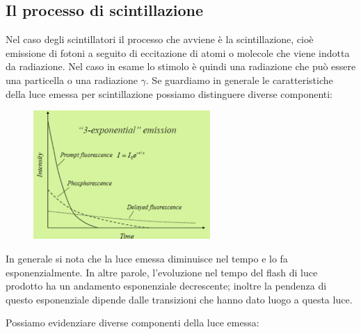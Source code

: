 \subsection{Il processo di scintillazione}
Nel caso degli scintillatori il processo che avviene è la scintillazione, cioè emissione di fotoni a seguito di eccitazione di atomi o molecole che viene indotta da radiazione. Nel caso in esame lo stimolo è quindi una radiazione che può essere una particella o una radiazione $\gamma$. Se guardiamo in generale le caratteristiche della luce emessa per scintillazione possiamo distinguere diverse componenti:
\begin{figure}[H]
   \centering
   \includegraphics[width=0.6\textwidth]{immagini/tipi_di_luce.png}
\end{figure}
In generale si nota che la luce emessa diminuisce nel tempo e lo fa esponenzialmente. In altre parole, l'evoluzione nel tempo del flash di luce prodotto ha un andamento esponenziale decrescente; inoltre la pendenza di questo esponenziale dipende dalle transizioni che hanno dato luogo a questa luce.

Possiamo evidenziare diverse componenti della luce emessa:

